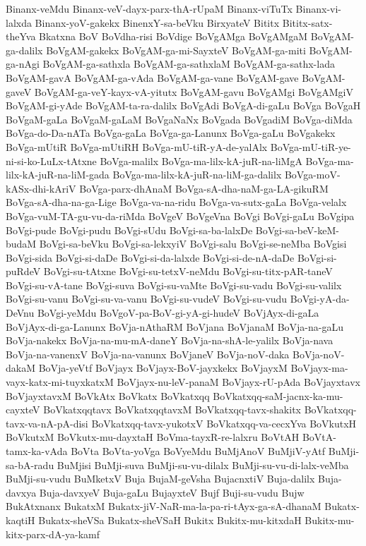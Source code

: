 {Binanx-veMdu
Binanx-veV-dayx-parx-thA-rUpaM
Binanx-viTuTx
Binanx-vi-lalxda
Binanx-yoV-gakekx
BinenxY-sa-beVku
BirxyateV
Bititx
Bititx-satx-theYva
Bkatxna
BoV
BoVdha-risi
BoVdige
BoVgAMga
BoVgAMgaM
BoVgAM-ga-dalilx
BoVgAM-gakekx
BoVgAM-ga-mi-SayxteV
BoVgAM-ga-miti
BoVgAM-ga-nAgi
BoVgAM-ga-sathxla
BoVgAM-ga-sathxlaM
BoVgAM-ga-sathx-lada
BoVgAM-gavA
BoVgAM-ga-vAda
BoVgAM-ga-vane
BoVgAM-gave
BoVgAM-gaveV
BoVgAM-ga-veY-kayx-vA-yitutx
BoVgAM-gavu
BoVgAMgi
BoVgAMgiV
BoVgAM-gi-yAde
BoVgAM-ta-ra-dalilx
BoVgAdi
BoVgA-di-gaLu
BoVga
BoVgaH
BoVgaM-gaLa
BoVgaM-gaLaM
BoVgaNaNx
BoVgada
BoVgadiM
BoVga-diMda
BoVga-do-Da-nATa
BoVga-gaLa
BoVga-ga-Lanunx
BoVga-gaLu
BoVgakekx
BoVga-mUtiR
BoVga-mUtiRH
BoVga-mU-tiR-yA-de-yalAlx
BoVga-mU-tiR-ye-ni-si-ko-LuLx-tAtxne
BoVga-malilx
BoVga-ma-lilx-kA-juR-na-liMgA
BoVga-ma-lilx-kA-juR-na-liM-gada
BoVga-ma-lilx-kA-juR-na-liM-ga-dalilx
BoVga-moV-kASx-dhi-kAriV
BoVga-parx-dhAnaM
BoVga-sA-dha-naM-ga-LA-gikuRM
BoVga-sA-dha-na-ga-Lige
BoVga-va-na-ridu
BoVga-va-sutx-gaLa
BoVga-velalx
BoVga-vuM-TA-gu-vu-da-riMda
BoVgeV
BoVgeVna
BoVgi
BoVgi-gaLu
BoVgipa
BoVgi-pude
BoVgi-pudu
BoVgi-sUdu
BoVgi-sa-ba-lalxDe
BoVgi-sa-beV-keM-budaM
BoVgi-sa-beVku
BoVgi-sa-lekxyiV
BoVgi-salu
BoVgi-se-neMba
BoVgisi
BoVgi-sida
BoVgi-si-daDe
BoVgi-si-da-lalxde
BoVgi-si-de-nA-daDe
BoVgi-si-puRdeV
BoVgi-su-tAtxne
BoVgi-su-tetxV-neMdu
BoVgi-su-titx-pAR-taneV
BoVgi-su-vA-tane
BoVgi-suva
BoVgi-su-vaMte
BoVgi-su-vadu
BoVgi-su-valilx
BoVgi-su-vanu
BoVgi-su-va-vanu
BoVgi-su-vudeV
BoVgi-su-vudu
BoVgi-yA-da-DeVnu
BoVgi-yeMdu
BoVgoV-pa-BoV-gi-yA-gi-hudeV
BoVjAyx-di-gaLa
BoVjAyx-di-ga-Lanunx
BoVja-nAthaRM
BoVjana
BoVjanaM
BoVja-na-gaLu
BoVja-nakekx
BoVja-na-mu-mA-daneY
BoVja-na-shA-le-yalilx
BoVja-nava
BoVja-na-vanenxV
BoVja-na-vanunx
BoVjaneV
BoVja-noV-daka
BoVja-noV-dakaM
BoVja-yeVtf
BoVjayx
BoVjayx-BoV-jayxkekx
BoVjayxM
BoVjayx-ma-vayx-katx-mi-tuyxkatxM
BoVjayx-nu-leV-panaM
BoVjayx-rU-pAda
BoVjayxtavx
BoVjayxtavxM
BoVkAtx
BoVkatx
BoVkatxqq
BoVkatxqq-saM-jacnx-ka-mu-cayxteV
BoVkatxqqtavx
BoVkatxqqtavxM
BoVkatxqq-tavx-shakitx
BoVkatxqq-tavx-va-nA-pA-disi
BoVkatxqq-tavx-yukotxV
BoVkatxqq-va-cecxYva
BoVkutxH
BoVkutxM
BoVkutx-mu-dayxtaH
BoVma-tayxR-re-lalxru
BoVtAH
BoVtA-tamx-ka-vAda
BoVta
BoVta-yoVga
BoVyeMdu
BuMjAnoV
BuMjiV-yAtf
BuMji-sa-bA-radu
BuMjisi
BuMji-suva
BuMji-su-vu-dilalx
BuMji-su-vu-di-lalx-veMba
BuMji-su-vudu
BuMketxV
Buja
BujaM-geVsha
BujacnxtiV
Buja-dalilx
Buja-davxya
Buja-davxyeV
Buja-gaLu
BujayxteV
Bujf
Buji-su-vudu
Bujw
BukAtxnanx
BukatxM
Bukatx-jiV-NaR-ma-la-pa-ri-tAyx-ga-sA-dhanaM
Bukatx-kaqtiH
Bukatx-sheVSa
Bukatx-sheVSaH
Bukitx
Bukitx-mu-kitxdaH
Bukitx-mu-kitx-parx-dA-ya-kamf
}
